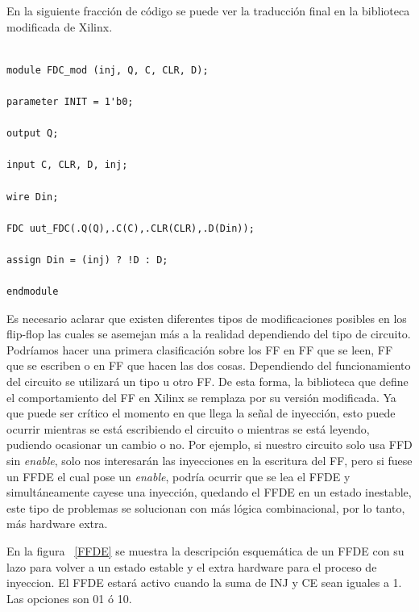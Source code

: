 \documentclass[a4paper,openright,12pt]{report}
\begin{document}
En la siguiente fracción de  código se puede ver la traducción final en la biblioteca modificada de Xilinx.
\lstset{frame=tb,
  language=VHDL,
  aboveskip=3mm,
  belowskip=3mm,
  showstringspaces=false,
  columns=flexible,
  basicstyle=\ttfamily,
  numbers=none,
  breakatwhitespace=true,
  tabsize=2
}

\begin{lstlisting}

module FDC_mod (inj, Q, C, CLR, D);

parameter INIT = 1'b0;

output Q;

input C, CLR, D, inj;

wire Din;

FDC uut_FDC(.Q(Q),.C(C),.CLR(CLR),.D(Din));

assign Din = (inj) ? !D : D;

endmodule

\end{lstlisting}

Es necesario  aclarar que existen diferentes tipos de modificaciones posibles en los flip-flop las cuales se asemejan más a la realidad dependiendo del tipo de circuito. Podríamos hacer una primera clasificación sobre los FF en FF que se leen, FF que  se escriben o en FF que hacen las dos cosas. Dependiendo del funcionamiento del circuito se utilizará un tipo u otro FF. De esta forma, la biblioteca que define el comportamiento del FF en Xilinx se remplaza por su versión modificada. Ya que puede ser crítico el momento en que llega la señal de inyección, esto puede ocurrir mientras se está escribiendo el circuito o mientras se está leyendo, pudiendo ocasionar un cambio o no. Por ejemplo, si nuestro circuito solo usa FFD sin \textit{enable}, solo nos interesarán las inyecciones en la escritura del FF, pero si fuese un FFDE el cual pose un \textit{enable}, podría ocurrir que se lea  el FFDE y simultáneamente cayese una inyección, quedando el FFDE en un estado inestable, este tipo de problemas se solucionan con  más lógica combinacional, por lo tanto, más hardware extra.

En la figura ~\ref{FFDE} se muestra la descripción esquemática de un FFDE con su lazo para volver  a un estado estable y el extra hardware para el proceso de inyeccion. El FFDE estará activo cuando la suma de INJ y CE sean iguales a 1. Las opciones son  01 ó 10.  
\end{document}
